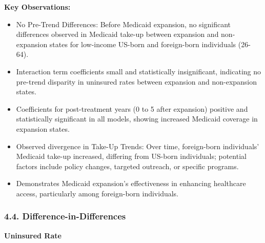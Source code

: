 \documentclass[
]{article}
\begin{document}
\textbf{Key Observations:}

\begin{itemize}
\item
  No Pre-Trend Differences: Before Medicaid expansion, no significant
  differences observed in Medicaid take-up between expansion and
  non-expansion states for low-income US-born and foreign-born
  individuals (26-64).
\item
  Interaction term coefficients small and statistically insignificant,
  indicating no pre-trend disparity in uninsured rates between expansion
  and non-expansion states.
\item
  Coefficients for post-treatment years (0 to 5 after expansion)
  positive and statistically significant in all models, showing
  increased Medicaid coverage in expansion states.
\item
  Observed divergence in Take-Up Trends: Over time, foreign-born
  individuals' Medicaid take-up increased, differing from US-born
  individuals; potential factors include policy changes, targeted
  outreach, or specific programs.
\item
  Demonstrates Medicaid expansion's effectiveness in enhancing
  healthcare access, particularly among foreign-born individuals.
\end{itemize}

\hypertarget{difference-in-differences}{%
\subsubsection{4.4.
Difference-in-Differences}\label{difference-in-differences}}

\textbf{Uninsured Rate}
\end{document}
